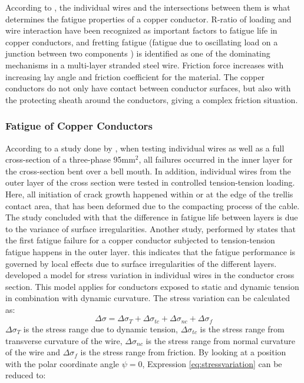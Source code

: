 \noindent According to \cite{Karlsen2010}, the individual wires and the intersections between them is what determines the fatigue properties of a copper conductor. R-ratio of loading and wire interaction have been recognized as important factors to fatigue life in copper conductors, and fretting fatigue (fatigue due to oscillating load on a junction between two components \cite{Hills1994}) is identified as one of the dominating mechanisms in a multi-layer stranded steel wire. Friction force increases with increasing lay angle and friction coefficient for the material. The copper conductors do not only have contact between conductor surfaces, but also with the protecting sheath around the conductors, giving a complex friction situation.

\subsubsection{Fatigue of Copper Conductors}
\label{sec:fatcop}
According to a study done by \cite{Nasution2013}, when testing individual wires as well as a full cross-section of a three-phase 95mm$^2$, all failures occurred in the inner layer for the cross-section bent over a bell mouth. In addition, individual wires from the outer layer of the cross section were tested in controlled tension-tension loading. Here, all initiation of crack growth happened within or at the edge of the trellis contact area, that has been deformed due to the compacting process of the cable. The study concluded with that the difference in fatigue life between layers is due to the variance of surface irregularities. Another study, performed by \cite{NASUTION2014} states that the first fatigue failure for a copper conductor subjected to tension-tension fatigue happens in the outer layer. this indicates that the fatigue performance is governed by local effects due to surface irregularities of the different layers. \newline
\newline
\noindent \cite{s300} developed a model for stress variation in individual wires in the conductor cross section. This model applies for conductors exposed to static and dynamic tension in combination with dynamic curvature. The stress variation can be calculated as:   
\begin{equation}
    \Delta \sigma = \Delta \sigma_T + \Delta \sigma_{tc} + \Delta \sigma_{nc} + \Delta \sigma_{f}
    \label{eq:stressvariation}
\end{equation}
\noindentWhere $\Delta \sigma_T$ is the stress range due to dynamic tension, $\Delta \sigma_{tc}$ is the stress range from transverse curvature of the wire, $\Delta \sigma_{nc}$ is the stress range from normal curvature of the wire and $\Delta \sigma_{f}$ is the stress range from friction. By looking at a position with the polar coordinate angle $\psi = 0$, Expression \ref{eq:stressvariation} can be reduced to:
